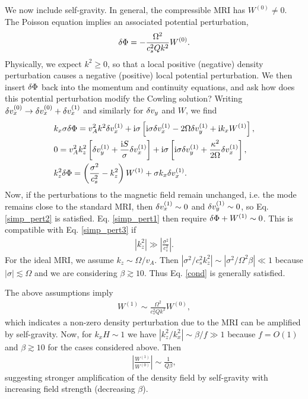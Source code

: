 We now include self-gravity. In general, the compressible MRI has
$W^{(0)}\neq0$. The Poisson equation implies
an associated potential perturbation,    
\begin{align} 
  \delta \Phi = -\frac{\Omega^2}{c_s^2 Q k^2} W^{(0)}.
\end{align}
Physically, we expect $k^2\geq0$, so that a local positive (negative) density
perturbation causes a negative (positive) local potential
perturbation. We then insert $\delta \Phi$ back into the momentum and
continuity equations, and ask how does this potential perturbation
modify the Cowling solution? Writing $\delta v_x^{(0)} \to \delta v_x^{(0)} +
\delta v_x^{(1)}$ and similarly for $\delta v_y $ and $ W$, we find 
\begin{align}
  &   k_x\sigma \delta \Phi = v_A^2k^2\delta v_x^{(1)} + \mathrm{i}\sigma\left[\mathrm{i}\sigma
  \delta v_x^{(1)} - 2\Omega\delta v_y^{(1)} + \mathrm{i} k_x W^{(1)}\right], \label{simp_pert1}\\ 
  &  0= v_A^2k_z^2\left[\delta v_y^{(1)} + \frac{\mathrm{i} S
    }{\sigma}\delta v_x^{(1)}\right] + \mathrm{i}\sigma\left[\mathrm{i}\sigma\delta v_y^{(1)} +
  \frac{\kappa^2}{2\Omega}\delta v_x^{(1)}\right],\label{simp_pert2}\\
  & k_z^2\delta \Phi  = \left(\frac{\sigma^2}{c_s^2}-k_z^2\right)W^{(1)} +
  \sigma k_x \delta v_x^{(1)}.\label{simp_pert3} 
\end{align}
Now, if the perturbations to the magnetic field remain
unchanged, i.e. the mode remains close to the standard MRI, then
$\delta v_x^{(1)} \sim 0$ and $\delta v_y^{(1)}\sim0$, so Eq. \ref{simp_pert2} is
satisfied. Eq. \ref{simp_pert1} then require $\delta \Phi +
W^{(1)}\sim0$. This is compatible with Eq. \ref{simp_pert3} if 
\begin{align}
  \left|k_z^2\right| \gg \left|\frac{\sigma^2}{c_s^2}\right|. \label{cond}
\end{align}
For the ideal MRI,  we assume $k_z\sim \Omega/v_A$. Then
$|\sigma^2/c_s^2k_z^2|\sim |\sigma^2/\Omega^2\beta|\ll1$ because
$|\sigma|\lesssim \Omega$ and we are considering $\beta\gtrsim 10$. 
Thus Eq. \ref{cond} is generally satisfied.   

The above assumptions imply
\begin{align}
  W^{(1)} \sim \frac{\Omega^2}{c_s^2 Q k^2} W^{(0)},\label{feedback}
\end{align} 
which indicates a non-zero density perturbation due to the
MRI can be amplified by self-gravity. Now, for $k_xH\sim 1$ we have
$|k_z^2/k_x^2|\sim \beta/f\gg1$ because $f=O(1)$ and $\beta\gtrsim10$
for the cases considered above. Then
\begin{align}
  \left|\frac{W^{(1)}}{W^{(0)}}\right| \sim \frac{1}{Q\beta}, 
\end{align}
 suggesting stronger amplification of the density field by 
 self-gravity with increasing field strength (decreasing
 $\beta$). 

